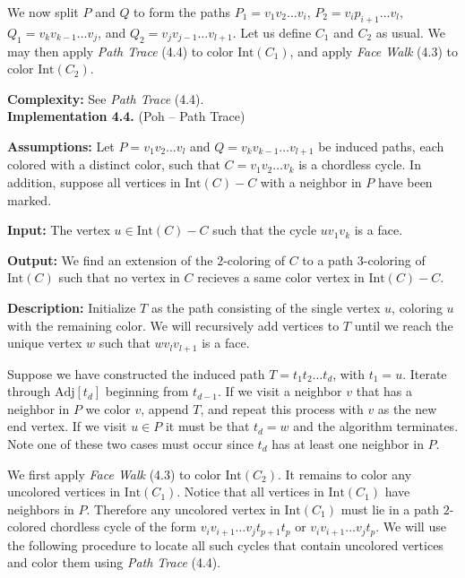\documentclass[letterpaper, 12pt]{article}
\theoremstyle{definition}
\theoremstyle{definition}
\theoremstyle{thm}
\theoremstyle{definition}
\begin{document}
We now split $P$ and $Q$ to form the paths
$P_1=v_1v_2\ldots v_i$, $P_2=v_ip_{i+1}\ldots v_l$, $Q_1=v_kv_{k-1}\ldots v_j$,
and $Q_2=v_jv_{j-1}\ldots v_{l+1}$. Let us define $C_1$ and $C_2$ as usual.
We may then apply \textit{Path Trace} (4.4) to color $\text{Int}(C_1)$, and
apply \textit{Face Walk} (4.3) to color $\text{Int}(C_2)$.

\noindent\textbf{Complexity:} See \textit{Path Trace} (4.4).\\

\noindent\textbf{Implementation 4.4.} (Poh -- Path Trace)

\noindent\textbf{Assumptions:} Let $P=v_1v_2\ldots v_l$ and
$Q=v_kv_{k-1}\ldots v_{l+1}$ be induced paths, each colored with a distinct color,
such that $C=v_1v_2\ldots v_k$ is a chordless cycle. In
addition, suppose all vertices in $\text{Int}(C)- C$ with a neighbor in $P$
have been marked.

\noindent\textbf{Input:} The vertex $u\in \text{Int}(C)-C$ such that the cycle
$uv_1v_k$ is a face.

\noindent\textbf{Output:} We find an extension of the $2$-coloring of $C$ to a
path $3$-coloring of $\text{Int}(C)$ such that no vertex in $C$ recieves a same
color vertex in $\text{Int}(C)-C$.

\noindent\textbf{Description:} Initialize $T$ as the path consisting of the
single vertex $u$, coloring $u$ with the remaining color. We will recursively
add vertices to $T$ until we reach the unique vertex $w$ such that $wv_lv_{l+1}$
is a face.

Suppose we have constructed the induced path $T=t_1t_2\ldots t_d$, with $t_1=u$.
Iterate through $\text{Adj}[t_d]$
beginning from $t_{d-1}$. If we visit a neighbor $v$ that has a neighbor in
$P$ we color $v$, append $T$, and repeat this process with $v$ as the new
end vertex. If we visit $u\in P$ it must be that $t_d=w$ and
the algorithm terminates. Note one of these two cases must occur since $t_d$
has at least one neighbor in $P$.

We first apply \textit{Face Walk} (4.3) to color $\text{Int}(C_2)$. It remains
to color any uncolored vertices in $\text{Int}(C_1)$. Notice that all vertices
in $\text{Int}(C_1)$ have neighbors in $P$. Therefore any uncolored
vertex in $\text{Int}(C_1)$ must lie in a path $2$-colored chordless cycle of
the form $v_iv_{i+1}\ldots v_jt_{p+1}t_p$ or $v_iv_{i+1}\ldots v_jt_p$.
We will use the following procedure to locate all such cycles that contain
uncolored vertices and color them using \textit{Path Trace} (4.4).
\end{document}
